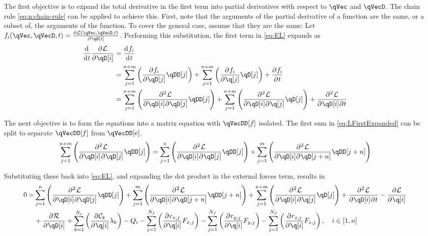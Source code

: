 \documentclass[11pt]{article}
\newcommand{\oD}[2]{
    \frac{\mathrm{d}\mspace{1mu}#1}{\mathrm{d}\mspace{1mu}#2}
}
\newcommand{\pD}[2]{
    \frac{\partial\mspace{1mu}#1}{\partial\mspace{1mu}#2}
}
\newcommand{\pDD}[3]{
    \frac{\partial{^{\mspace{1mu}2}}\mspace{1mu}#1}{\partial\mspace{1mu}#2\mspace{1mu}\partial\mspace{1mu}#3}
}
\begin{document}
The first objective is to expand the total derivative in the first term into partial derivatives with respect to $\qVec$ and $\qVecD$. The chain rule \eqref{eq:n:chain-rule} can be applied to achieve this. First, note that the arguments of the partial derivative of a function are the same, or a subset of, the arguments of the function. To cover the general case, assume that they are the same: Let $f_i(\qVec, \qVecD, t)=\pD{\mathcal{L}(\qVec, \qVecD, t)}{\qD[i]}$. Performing this substitution, the first term in \eqref{eq:EL} expands as
\begin{align} \label{eq:LFirstExpanded}
    \oD{}{t}\pD{\mathcal{L}}{\qD[i]}
    &= \oD{f_i}{t} \nonumber\\
    &= \sum_{j=1}^{n+m} \del{\pD{f_i}{\qD[j]} \qDD[j]}
        + \sum_{j=1}^{n+m} \del{\pD{f_i}{\q[j]} \qD[j]}
        + \pD{f_i}{t} \nonumber\\
    &= \sum_{j=1}^{n+m} \del{\pDD{\mathcal{L}}{\qD[i]}{\qD[j]} \qDD[j]}
        + \sum_{j=1}^{n+m} \del{\pDD{\mathcal{L}}{\qD[i]}{\q[j]} \qD[j]}
        + \pDD{\mathcal{L}}{\qD[i]}{t}
\end{align}

The next objective is to form the equations into a matrix equation with $\qVecDD[f]$ isolated. The first sum in \eqref{eq:LFirstExpanded} can be split to separate $\qVecDD[f]$ from $\qVecDD[e]$.
\begin{equation}
    \sum_{j=1}^{n+m} \del{\pDD{\mathcal{L}}{\qD[i]}{\qD[j]} \qDD[j]}
    = \sum_{j=1}^{n} \del{\pDD{\mathcal{L}}{\qD[i]}{\qD[j]} \qDD[j]}
        + \sum_{j=1}^{m} \del{\pDD{\mathcal{L}}{\qD[i]}{\qD[j+n]} \qDD[j+n]}
\end{equation}

Substituting these back into \eqref{eq:EL}, and expanding the dot product in the external forces term, results in
\begin{align} \label{eq:EL-expanded}
    0=&\sum_{j=1}^{n} \del{\pDD{\mathcal{L}}{\qD[i]}{\qD[j]} \qDD[j]}
    + \sum_{j=1}^{m} \del{\pDD{\mathcal{L}}{\qD[i]}{\qD[j+n]} \qDD[j+n]}
    + \sum_{j=1}^{n+m} \del{\pDD{\mathcal{L}}{\qD[i]}{\q[j]} \qD[j]}
    + \pDD{\mathcal{L}}{\qD[i]}{t}
    - \pD{\mathcal{L}}{\q[i]} \nonumber\\
    &+ \pD{\mathcal{R}}{\qD[i]}
    + \sum_{k=1}^{N_c} \del{\pD{\mathcal{C}_k}{\q[i]} \lambda_k}
    - Q_i
    - \sum_{j=1}^{N_f} \del{\pD{r_{x,j}}{\q[i]} F_{x,j}}
    - \sum_{j=1}^{N_f} \del{\pD{r_{y,j}}{\q[i]} F_{y,j}}
    - \sum_{j=1}^{N_f} \del{\pD{r_{z,j}}{\q[i]} F_{z,j}}
    ,\quad i\in[1,n]
\end{align}
\end{document}
